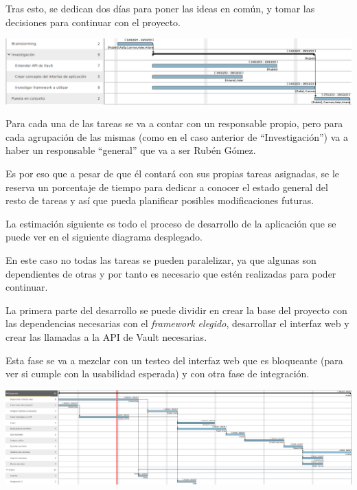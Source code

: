\documentclass{\ClassPath/viu-tfm-template}
\begin{document}
Tras esto, se dedican dos días para poner las ideas en común, y tomar las decisiones para continuar con el proyecto.

\begin{center}
    \vspace{-20pt}
    \includegraphics[frame,width=\linewidth]{img/gantt1.png}
    \vspace{-20pt}
\end{center}

Para cada una de las tareas se va a contar con un responsable propio, pero para cada agrupación de las mismas (como en el caso anterior de “Investigación”) va a haber un responsable “general” que va a ser Rubén Gómez.

Es por eso que a pesar de que él contará con sus propias tareas asignadas, se le reserva un porcentaje de tiempo para dedicar a conocer el estado general del resto de tareas y así que pueda planificar posibles modificaciones futuras.

La estimación siguiente es todo el proceso de desarrollo de la aplicación que se puede ver en el siguiente diagrama desplegado.

En este caso no todas las tareas se pueden paralelizar, ya que algunas son dependientes de otras y por tanto es necesario que estén realizadas para poder continuar.

La primera parte del desarrollo se puede dividir en crear la base del proyecto con las dependencias necesarias con el \textit{framework elegido}, desarrollar el interfaz web y crear las llamadas a la API de Vault necesarias.

Esta fase se va a mezclar con un testeo del interfaz web que es bloqueante (para ver si cumple con la usabilidad esperada) y con otra fase de integración.

\begin{center}
    \includegraphics[frame,width=\linewidth]{img/gantt2.png}
\end{center}
\end{document}
